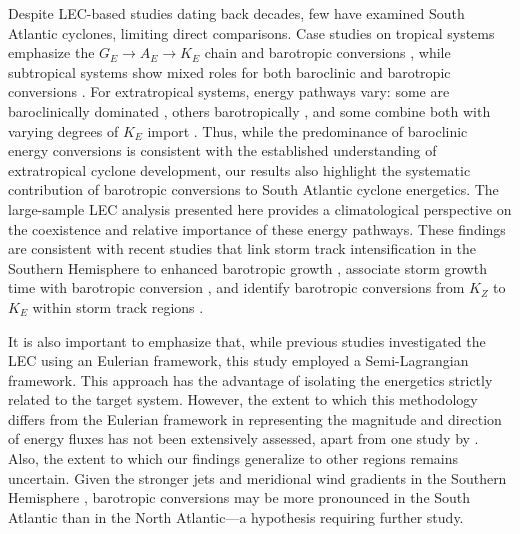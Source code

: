 \documentclass[pdflatex,sn-chicago]{sn-jnl}%
\theoremstyle{plain}
\theoremstyle{definition}
\theoremstyle{remark}
\theoremstyle{definition}
\begin{document}
Despite LEC-based studies dating back decades, few have examined South Atlantic cyclones, limiting direct comparisons. Case studies on tropical systems emphasize the $G_E \rightarrow A_E \rightarrow K_E$ chain and barotropic conversions \citep{brennan1980zonal,veiga2008analysis}, while subtropical systems show mixed roles for both baroclinic and barotropic conversions \citep{michaelides1987limited,dias2013synoptic,pezza2014large,cavicchia2018energetics}. For extratropical systems, energy pathways vary: some are baroclinically dominated \citep{dias2011energy,black2013universal}, others barotropically \citep{michaelides1992spatial,dias2011energy}, and some combine both with varying degrees of $K_E$ import \citep{wahab2002mechanism,bulic2006limited,pezza2010environmental}. Thus, while the predominance of baroclinic energy conversions is consistent with the established understanding of extratropical cyclone development, our results also highlight the systematic contribution of barotropic conversions to South Atlantic cyclone energetics. The large-sample LEC analysis presented here provides a climatological perspective on the coexistence and relative importance of these energy pathways. These findings are consistent with recent studies that link storm track intensification in the Southern Hemisphere to enhanced barotropic growth \citep{chemke2022intensification}, associate storm growth time with barotropic conversion \citep{hadas2025lagrangian}, and identify barotropic conversions from $K_Z$ to $K_E$ within storm track regions \citep{liu2024systematic}.

It is also important to emphasize that, while previous studies investigated the LEC using an Eulerian framework, this study employed a Semi-Lagrangian framework. This approach has the advantage of isolating the energetics strictly related to the target system. However, the extent to which this methodology differs from the Eulerian framework in representing the magnitude and direction of energy fluxes has not been extensively assessed, apart from one study by \citet{michaelides1999quasi}. Also, the extent to which our findings generalize to other regions remains uncertain. Given the stronger jets and meridional wind gradients in the Southern Hemisphere \citep[e.g.,][]{swart2019canadian,jain2023monsoon,savita2023assessment}, barotropic conversions may be more pronounced in the South Atlantic than in the North Atlantic—a hypothesis requiring further study.
\end{document}
